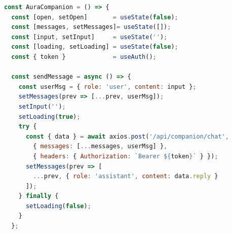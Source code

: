 \begin{lstlisting}[style=codeblock,language=JavaScript,caption={Interface Chat AuraCompanion (frontend)}]
const AuraCompanion = () => {
  const [open, setOpen]       = useState(false);
  const [messages, setMessages]= useState([]);
  const [input, setInput]     = useState('');
  const [loading, setLoading] = useState(false);
  const { token }             = useAuth();

  const sendMessage = async () => {
    const userMsg = { role: 'user', content: input };
    setMessages(prev => [...prev, userMsg]);
    setInput('');
    setLoading(true);
    try {
      const { data } = await axios.post('/api/companion/chat',
        { messages: [...messages, userMsg] },
        { headers: { Authorization: `Bearer ${token}` } });
      setMessages(prev => [
        ...prev, { role: 'assistant', content: data.reply }
      ]);
    } finally {
      setLoading(false);
    }
  };


\end{lstlisting}
